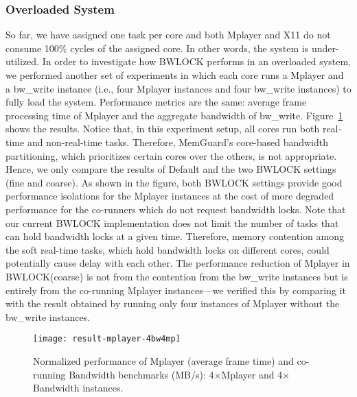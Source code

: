\documentclass[times, 10pt,onecolumn]{article}
\begin{document}
\subsubsection{Overloaded System}
So far, we have assigned one task per core and both Mplayer and X11 do not
consume 100\% cycles of the assigned core. In other words, the system
is under-utilized. In order to investigate how BWLOCK performs in an
overloaded system, we performed another set of experiments in which
each core runs a Mplayer and a bw\_write instance (i.e., four Mplayer
instances and four bw\_write instances) to fully load the
system. Performance metrics are the same: average frame processing
time of Mplayer and the aggregate bandwidth of
bw\_write. Figure~\ref{fig:result-mplayer-4bw4mp} shows the
results. Notice that, in this experiment setup, all cores run both
real-time and non-real-time tasks. Therefore, MemGuard's core-based
bandwidth partitioning, which prioritizes certain cores over the
others, is not appropriate. Hence, we only compare the results of
Default and the two BWLOCK settings (fine and coarse). As shown in the
figure, both BWLOCK settings provide good performance isolations for
the Mplayer instances at the cost of more degraded performance for the
co-runners which do not request bandwidth locks. Note that our current
BWLOCK implementation does not limit the number of tasks that can hold
bandwidth locks at a given time. Therefore, memory contention among
the soft real-time tasks, which hold bandwidth locks on different
cores, could potentially cause delay with each other. The performance
reduction of Mplayer in BWLOCK(coarse) is not from the contention from
the bw\_write instances but is entirely from the co-running Mplayer
instances---we verified this by comparing it with the result obtained
by running only four instances of Mplayer without the bw\_write
instances.

\begin{figure}
\centering
\texttt{[image: result-mplayer-4bw4mp]}
\caption{Normalized performance of Mplayer (average frame time) and
co-running Bandwidth benchmarks (MB/s): 4$\times$Mplayer and 4$\times$Bandwidth instances.}
\label{fig:result-mplayer-4bw4mp}
\end{figure}
\end{document}
